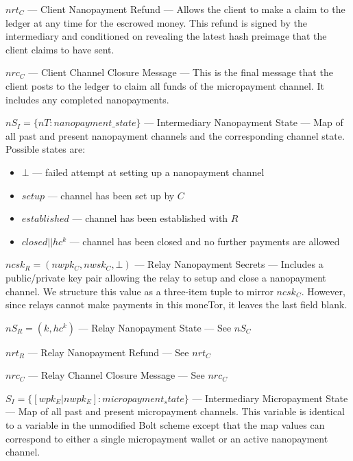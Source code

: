 $nrt_C$ --- Client Nanopayment Refund --- Allows the client to make a claim to the ledger at any time for the escrowed money.
This refund is signed by the intermediary and conditioned on revealing the latest hash preimage that the client claims to have sent.

$nrc_C$ --- Client Channel Closure Message --- This is the final message that the client posts to the ledger to claim all funds of the micropayment channel.
It includes any completed nanopayments.

$nS_I = \{nT: nanopayment\_state\}$ --- Intermediary Nanopayment State --- Map of all past and present nanopayment channels and the corresponding channel state.
Possible states are:

\begin{itemize}
\item $\bot$ --- failed attempt at setting up a nanopayment channel
\item $setup$ --- channel has been set up by $C$
\item $established$ --- channel has been established with $R$
\item $closed||hc^k$ --- channel has been closed and no further payments
  are allowed
\end{itemize}

$ncsk_R = (nwpk_C, nwsk_C, \bot)$ --- Relay Nanopayment Secrets --- Includes a public/private key pair allowing the relay to setup and close a nanopayment channel.
We structure this value as a three-item tuple to mirror $ncsk_C$.
However, since relays cannot make payments in this moneTor, it leaves the last field blank.

$nS_R = (k, hc^k)$ --- Relay Nanopayment State --- See $nS_C$

$nrt_R$ --- Relay Nanopayment Refund --- See $nrt_C$

$nrc_C$ --- Relay Channel Closure Message --- See $nrc_C$

$S_I = \{ [wpk_E | nwpk_E] : micropayment_state\}$ --- Intermediary Micropayment State --- Map of all past and present micropayment channels. This variable is identical to a variable in the unmodified Bolt scheme except that the map values can correspond to either a single micropayment wallet or an active nanopayment channel.


